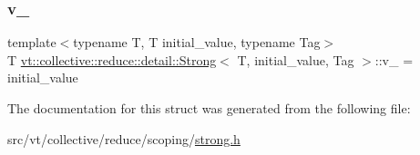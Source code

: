 \subsubsection{\texorpdfstring{v\+\_\+}{v\_}}
{\footnotesize\ttfamily template$<$typename T, T initial\+\_\+value, typename Tag$>$ \\
T \hyperlink{structvt_1_1collective_1_1reduce_1_1detail_1_1_strong}{vt\+::collective\+::reduce\+::detail\+::\+Strong}$<$ T, initial\+\_\+value, Tag $>$\+::v\+\_\+ = initial\+\_\+value\hspace{0.3cm}{\ttfamily [private]}}



The documentation for this struct was generated from the following file\+:\begin{DoxyCompactItemize}
\item 
src/vt/collective/reduce/scoping/\hyperlink{strong_8h}{strong.\+h}\end{DoxyCompactItemize}
